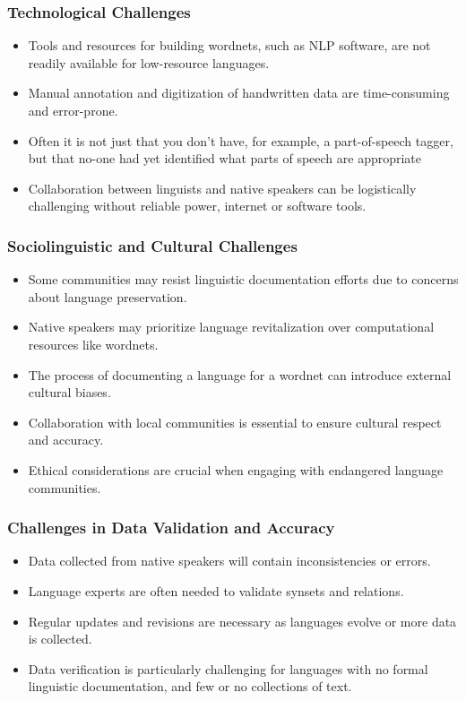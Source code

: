 \documentclass[xetex]{beamer}  %
\begin{document}
\begin{frame}
\frametitle{Technological Challenges}

\begin{itemize}
    \item Tools and resources for building wordnets, such as NLP software, are not readily available for low-resource languages.
    \item Manual annotation and digitization of handwritten data are time-consuming and error-prone.
    \item Often it is not just that you don't have, for example, a  part-of-speech tagger, but that no-one had yet identified what parts of speech are appropriate
    \item Collaboration between linguists and native speakers can be logistically challenging without reliable power, internet or software tools.
\end{itemize}
\end{frame}

\begin{frame}
\frametitle{Sociolinguistic and Cultural Challenges}

\begin{itemize}
    \item Some communities may resist linguistic documentation efforts due to concerns about language preservation.
    \item Native speakers may prioritize language revitalization over computational resources like wordnets.
    \item The process of documenting a language for a wordnet can introduce external cultural biases.
    \item[$\star$] Collaboration with local communities is essential to ensure cultural respect and accuracy.
    \item[$\star$] Ethical considerations are crucial when engaging with endangered language communities.
\end{itemize}
\end{frame}

\begin{frame}
\frametitle{Challenges in Data Validation and Accuracy}

\begin{itemize}
    \item Data collected from native speakers will contain inconsistencies or errors.
    \item Language experts are often needed to validate synsets and relations.
    \item Regular updates and revisions are necessary as languages evolve or more data is collected.
    \item Data verification is particularly challenging for languages with no formal linguistic documentation, and few or no collections of text.
\end{itemize}
\end{frame}
\end{document}

